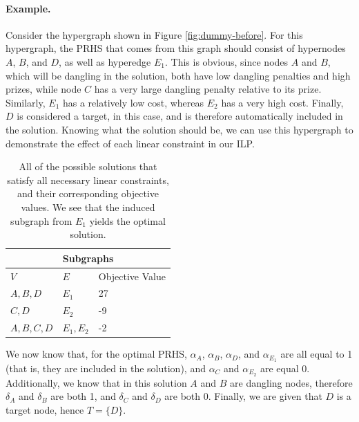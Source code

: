\documentclass[12pt,twoside]{reedthesis}
\theoremstyle{definition}
\begin{document}
\paragraph{Example.}Consider the hypergraph shown in Figure \ref{fig:dummy-before}. For this hypergraph, the PRHS that comes from this graph should consist of hypernodes $A$, $B$, and $D$, as well as hyperedge $E_1$. This is obvious, since nodes $A$ and $B$, which will be dangling in the solution, both have low dangling penalties and high prizes, while node $C$ has a very large dangling penalty relative to its prize. Similarly, $E_1$ has a relatively low cost, whereas $E_2$ has a very high cost. Finally, $D$ is considered a target, in this case, and is therefore automatically included in the solution. Knowing what the solution should be, we can use this hypergraph to demonstrate the effect of each linear constraint in our ILP.\par

\begin{table}[!h]
\begin{center}
  \label{tab:obj_values_dummy}
  \caption[Objective values of dummy hypergraph.]{All of the possible solutions that satisfy all necessary linear constraints, and their corresponding objective values. We see that the induced subgraph from $E_1$ yields the optimal solution.}
\begin{tabular}{ |l|l|l| }%
  \hline%
  \multicolumn{3}{|c|}{Subgraphs} \\%
  \hline \hline
  $V$ & $E$ & Objective Value \\ \hline%
  $A,B,D$ & $E_1$ & 27 \\ \hline%
  $C,D$ & $E_2$ & -9 \\ \hline%
  $A,B,C,D$ & $E_1,E_2$ & -2 \\ \hline%
\end{tabular}%
\end{center}
\end{table}

We now know that, for the optimal PRHS, $\alpha_A$, $\alpha_B$, $\alpha_D$, and $\alpha_{E_1}$ are all equal to 1 (that is, they are included in the solution), and $\alpha_C$ and $\alpha_{E_2}$ are equal 0. Additionally, we know that in this solution $A$ and $B$ are dangling nodes, therefore $\delta_A$ and $\delta_B$ are both 1, and $\delta_C$ and $\delta_D$ are both 0. Finally, we are given that $D$ is a target node, hence $T=\{D\}$.\par
\end{document}
